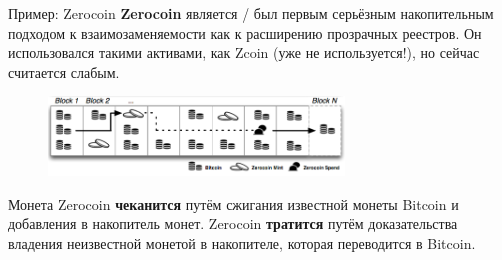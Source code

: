 \documentclass[aspectratio=169]{beamer}
\begin{document}
\begin{frame}{Пример: Zerocoin}
\textbf{Zerocoin} является / был первым серьёзным накопительным подходом к взаимозаменяемости как к расширению прозрачных реестров. Он использовался такими активами, как Zcoin (уже не используется!), но сейчас считается слабым.

\begin{figure}
\includegraphics[width=0.7\textwidth]{zerocoin-chain.png}
\end{figure}

Монета Zerocoin \textbf{чеканится} путём сжигания известной монеты Bitcoin и добавления в накопитель монет. Zerocoin \textbf{тратится} путём доказательства владения неизвестной монетой в накопителе, которая переводится в Bitcoin.
\end{frame}
\end{document}
